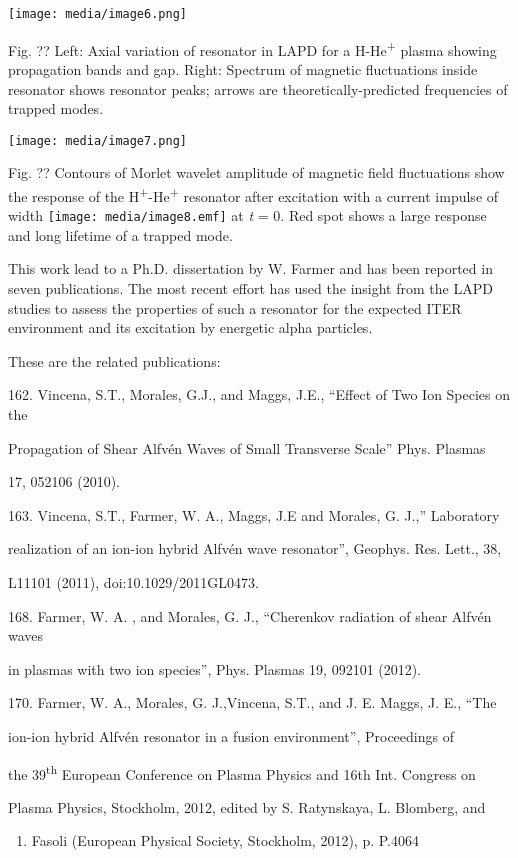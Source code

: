 \documentclass[11pt]{article}
\begin{document}
\begin{description}
\texttt{[image: media/image6.png]}

Fig. ?? Left: Axial variation of resonator in LAPD for a
H-He\textsuperscript{+} plasma showing propagation bands and gap. Right:
Spectrum of magnetic fluctuations inside resonator shows resonator
peaks; arrows are theoretically-predicted frequencies of trapped modes.

\texttt{[image: media/image7.png]}

Fig. ?? Contours of Morlet wavelet amplitude of magnetic field
fluctuations show the response of the
H\textsuperscript{+}-He\textsuperscript{+} resonator after excitation
with a current impulse of width \texttt{[image: media/image8.emf]} at
\emph{t} = 0. Red spot shows a large response and long lifetime of a
trapped mode.

This work lead to a Ph.D. dissertation by W. Farmer and has been
reported in seven publications. The most recent effort has used the
insight from the LAPD studies to assess the properties of such a
resonator for the expected ITER environment and its excitation by
energetic alpha particles.

These are the related publications:

162. Vincena, S.T., Morales, G.J., and Maggs, J.E., ``Effect of Two Ion
Species on the

Propagation of Shear Alfvén Waves of Small Transverse Scale'' Phys.
Plasmas

17, 052106 (2010).

163. Vincena, S.T., Farmer, W. A., Maggs, J.E and Morales, G. J.,''
Laboratory

realization of an ion-ion hybrid Alfvén wave resonator'', Geophys. Res.
Lett., 38,

L11101 (2011), doi:10.1029/2011GL0473.

168. Farmer, W. A. , and Morales, G. J., ``Cherenkov radiation of shear
Alfvén waves

in plasmas with two ion species'', Phys. Plasmas 19, 092101 (2012).

170. Farmer, W. A., Morales, G. J.,Vincena, S.T., and J. E. Maggs, J.
E., ``The

ion-ion hybrid Alfvén resonator in a fusion environment'', Proceedings
of

the 39\textsuperscript{th} European Conference on Plasma Physics and
16th Int. Congress on

Plasma Physics, Stockholm, 2012, edited by S. Ratynskaya, L. Blomberg,
and


\begin{enumerate}
\def\labelenumi{\Alph{enumi}.}
\item
  Fasoli (European Physical Society, Stockholm, 2012), p. P.4064
\end{enumerate}



\end{description}
\end{document}
